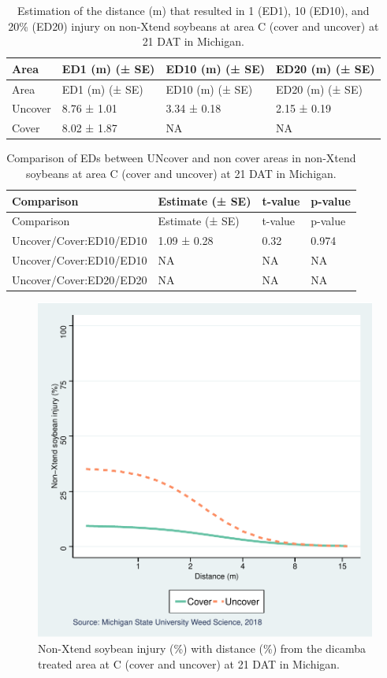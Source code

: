 \documentclass[]{article}
\begin{document}
\begin{longtable}[]{@{}llll@{}}
\caption{Estimation of the distance (m) that resulted in 1 (ED1), 10
(ED10), and 20\% (ED20) injury on non-Xtend soybeans at area C (cover
and uncover) at 21 DAT in Michigan.}\tabularnewline
\toprule
Area & ED1 (m) (± SE) & ED10 (m) (± SE) & ED20 (m) (± SE)\tabularnewline
\midrule
\endfirsthead
\toprule
Area & ED1 (m) (± SE) & ED10 (m) (± SE) & ED20 (m) (± SE)\tabularnewline
\midrule
\endhead
Uncover & 8.76 ± 1.01 & 3.34 ± 0.18 & 2.15 ± 0.19\tabularnewline
Cover & 8.02 ± 1.87 & NA & NA\tabularnewline
\bottomrule
\end{longtable}

\begin{longtable}[]{@{}llll@{}}
\caption{Comparison of EDs between UNcover and non cover areas in
non-Xtend soybeans at area C (cover and uncover) at 21 DAT in
Michigan.}\tabularnewline
\toprule
Comparison & Estimate (± SE) & t-value & p-value\tabularnewline
\midrule
\endfirsthead
\toprule
Comparison & Estimate (± SE) & t-value & p-value\tabularnewline
\midrule
\endhead
Uncover/Cover:ED10/ED10 & 1.09 ± 0.28 & 0.32 & 0.974\tabularnewline
Uncover/Cover:ED10/ED10 & NA & NA & NA\tabularnewline
Uncover/Cover:ED20/ED20 & NA & NA & NA\tabularnewline
\bottomrule
\end{longtable}

\begin{figure}
\centering
\includegraphics{Report_Dicamba_study_files/figure-latex/unnamed-chunk-53-1.pdf}
\caption{Non-Xtend soybean injury (\%) with distance (\%) from the
dicamba treated area at C (cover and uncover) at 21 DAT in Michigan.}
\end{figure}
\end{document}
